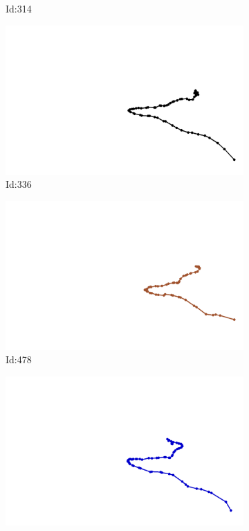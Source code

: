 \documentclass[12pt,twoside]{report}
\begin{document}
\begin{figure}
\begin{subfigure}[b]{0.20\textwidth}
\caption{Id:314}
\end{subfigure}
\begin{subfigure}[b]{0.20\textwidth}
\centering
\includegraphics[width=\textwidth]{../../trajectories/336.png}
\caption{Id:336}
\end{subfigure}
\begin{subfigure}[b]{0.20\textwidth}
\centering
\includegraphics[width=\textwidth]{../../trajectories/478.png}
\caption{Id:478}
\end{subfigure}
\begin{subfigure}[b]{0.20\textwidth}
\centering
\includegraphics[width=\textwidth]{../../trajectories/504.png}

\end{subfigure}
\end{figure}
\end{document}
